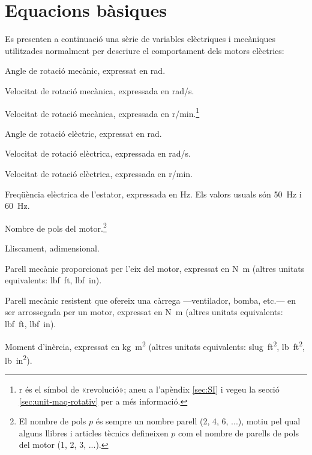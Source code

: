 \section{Equacions bàsiques}

Es presenten a continuació una sèrie de variables elèctriques i mecàniques utilitzades normalment per descriure el comportament dels motors elèctrics:

\begin{list}{}
   {\setlength{\labelwidth}{15mm} \setlength{\leftmargin}{20mm} \setlength{\labelsep}{5mm}}
   \item[$\theta\ped{m}$] Angle de rotació mecànic, expressat en \unit{rad}.
   \item[$\omega\ped{m}$] Velocitat de rotació mecànica, expressada en \unit{rad/s}.
   \item[$n\ped{m}$] Velocitat de rotació mecànica, expressada en \unit{r/min}.\footnote{r és el símbol de «revolució»; aneu a l'apèndix \ref{sec:SI} i vegeu la secció \ref{sec:unit-maq-rotativ} per a més informació.}
   \item[$\theta$] Angle de rotació elèctric, expressat en \unit{rad}.
   \item[$\omega$] Velocitat de rotació elèctrica, expressada en \unit{rad/s}.
   \item[$n$] Velocitat de rotació elèctrica, expressada en \unit{r/min}.
   \item[$f$] Freqüència elèctrica de l'estator, expressada en \unit{Hz}. Els valors usuals són \qty{50}{Hz} i \qty{60}{Hz}.
   \item[$p$] Nombre de pols del motor.\footnote{El nombre de pols $p$  és sempre un nombre parell (2, 4, 6, ...), motiu pel qual alguns llibres i articles tècnics  defineixen $p$ com el nombre de parells de pols del motor       (1, 2, 3, ...).}
   \item[$s$] Lliscament, adimensional.
   \item[$T\ped{m}$] Parell mecànic proporcionat per l'eix del motor, expressat en \unit{N.m} (altres unitats equivalents: \unit{lbf.ft}, \unit{lbf.in}).
   \item[$T\ped{load}$] Parell mecànic resistent que ofereix una càrrega ---ventilador, bomba, etc.--- en ser arrossegada per un motor, expressat en \unit{N.m} (altres unitats equivalents: \unit{lbf.ft}, \unit{lbf.in}).
   \item[$J$] Moment d'inèrcia, expressat en \unit{kg.m^2} (altres unitats equivalents: \unit{slug.ft^2}, \unit{lb.ft^2}, \unit{lb.in^2}).

\end{list}
